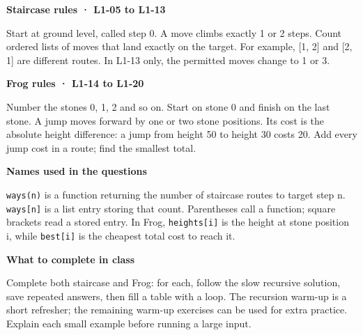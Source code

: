 \documentclass[11pt,a4paper]{article}
\begin{document}
\textbf{Staircase rules · L1-05 to L1-13}\par Start at ground level, called step 0. A move climbs exactly 1 or 2 steps. Count ordered lists of moves that land exactly on the target. For example, [1, 2] and [2, 1] are different routes. In L1-13 only, the permitted moves change to 1 or 3.\par\medskip
\textbf{Frog rules · L1-14 to L1-20}\par Number the stones 0, 1, 2 and so on. Start on stone 0 and finish on the last stone. A jump moves forward by one or two stone positions. Its cost is the absolute height difference: a jump from height 50 to height 30 costs 20. Add every jump cost in a route; find the smallest total.\par\medskip
\textbf{Names used in the questions}\par \texttt{ways(n)} is a function returning the number of staircase routes to target step n. \texttt{ways[n]} is a list entry storing that count. Parentheses call a function; square brackets read a stored entry. In Frog, \texttt{heights[i]} is the height at stone position i, while \texttt{best[i]} is the cheapest total cost to reach it.\par\medskip
\textbf{What to complete in class}\par Complete both staircase and Frog: for each, follow the slow recursive solution, save repeated answers, then fill a table with a loop. The recursion warm-up is a short refresher; the remaining warm-up exercises can be used for extra practice. Explain each small example before running a large input.\par\medskip
\end{document}
